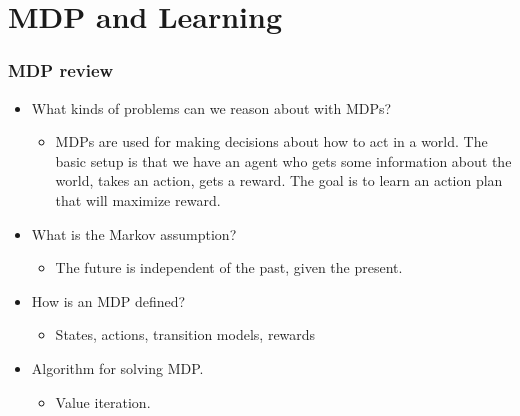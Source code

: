 \documentclass[compress, 9pt]{beamer}
\begin{document}
\section{MDP and Learning}
\label{sec-2}
\begin{frame}
\frametitle{MDP review}
\label{sec-2-1}
\begin{itemize}

\item <1-> What kinds of problems can we reason about with MDPs?
\label{sec-2-1-1}%
\begin{itemize}

\item <2-> MDPs are used for making decisions about how to act in a world. The basic setup is that we have an agent who gets some information about the world, takes an action, gets a reward. The goal is to learn an action plan that will maximize reward.
\label{sec-2-1-1-1}%
\end{itemize} %

\item <3-> What is the Markov assumption?
\label{sec-2-1-2}%
\begin{itemize}

\item <4-> The future is independent of the past, given the present.
\label{sec-2-1-2-1}%
\end{itemize} %

\item <5-> How is an MDP defined?
\label{sec-2-1-3}%
\begin{itemize}

\item <6-> States, actions, transition models, rewards
\label{sec-2-1-3-1}%
\end{itemize} %

\item <7-> Algorithm for solving MDP.
\label{sec-2-1-4}%
\begin{itemize}

\item Value iteration.
\label{sec-2-1-4-1}%
\end{itemize} %
\end{itemize} %
\end{frame}
\end{document}
